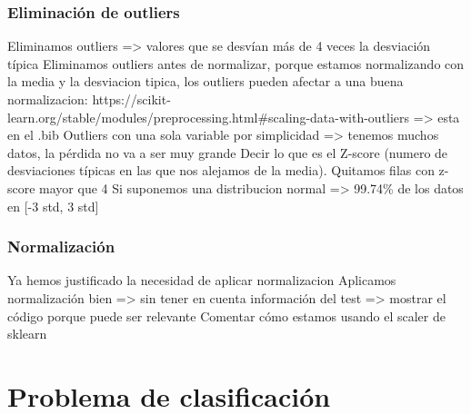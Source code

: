 \documentclass[11pt]{article}
\begin{document}
\subsubsection{Eliminación de outliers}

Eliminamos outliers => valores que se desvían más de 4 veces la desviación típica
Eliminamos outliers antes de normalizar, porque estamos normalizando con la media y la desviacion tipica, los outliers pueden afectar a una buena normalizacion: https://scikit-learn.org/stable/modules/preprocessing.html#scaling-data-with-outliers => esta en el .bib
Outliers con una sola variable por simplicidad => tenemos muchos datos, la pérdida no va a ser muy grande
Decir lo que es el Z-score (numero de desviaciones típicas en las que nos alejamos de la media). Quitamos filas con z-score mayor que 4
Si suponemos una distribucion normal => 99.74\% de los datos en [-3 std, 3 std]

\subsubsection{Normalización}

Ya hemos justificado la necesidad de aplicar normalizacion
Aplicamos normalización bien => sin tener en cuenta información del test => mostrar el código porque puede ser relevante
Comentar cómo estamos usando el scaler de sklearn



\pagebreak
\section{Problema de clasificación}
\end{document}
